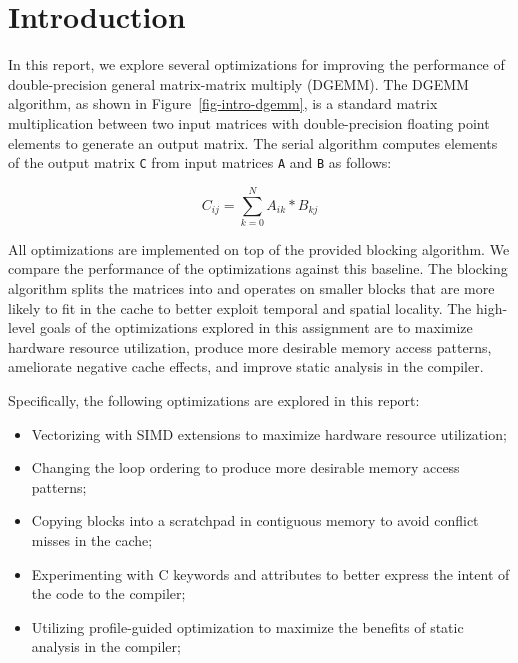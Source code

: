 
\section{Introduction}
\label{sec-intro}



In this report, we explore several optimizations for improving the
performance of double-precision general matrix-matrix multiply
(DGEMM). The DGEMM algorithm, as shown in Figure~\ref{fig-intro-dgemm},
is a standard matrix multiplication between two input matrices with
double-precision floating point elements to generate an output
matrix. The serial algorithm computes elements of the output matrix
{\tt{C}} from input matrices {\tt{A}} and {\tt{B}} as follows:

\[
C_{ij} = \sum_{k=0}^{N}A_{ik}*B_{kj}
\]
\smallskip

All optimizations are implemented on top of the provided blocking
algorithm. We compare the performance of the optimizations against this
baseline. The blocking algorithm splits the matrices into and operates on
smaller blocks that are more likely to fit in the cache to better exploit
temporal and spatial locality. The high-level goals of the optimizations
explored in this assignment are to maximize hardware resource
utilization, produce more desirable memory access patterns, ameliorate
negative cache effects, and improve static analysis in the compiler.

Specifically, the following optimizations are explored in this report:

\begin{itemize}
  \item Vectorizing with SIMD extensions to maximize hardware resource
    utilization;
  \item Changing the loop ordering to produce more desirable memory
    access patterns;
  \item Copying blocks into a scratchpad in contiguous memory to
    avoid conflict misses in the cache;
  \item Experimenting with C keywords and attributes to better express
    the intent of the code to the compiler;
  \item Utilizing profile-guided optimization to maximize the benefits of
    static analysis in the compiler;
\end{itemize}
\smallskip

\clearpage
